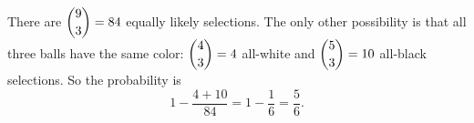 There are $\dbinom93=84$ equally likely selections. The only other possibility is that all three balls have the same color: $\dbinom43=4$ all-white and $\dbinom53=10$ all-black selections. So the probability is
\[1-\dfrac{4+10}{84}=1-\dfrac16=\boxed{\dfrac56}.\]
